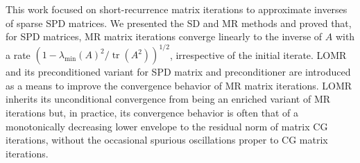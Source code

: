 \documentclass[numbers,webpdf,imanum]{ima-authoring-template}%
\theoremstyle{thmstyletwo}%
\numberwithin{equation}{section}
\begin{document}
This work focused on short-recurrence matrix iterations to approximate inverses of sparse SPD matrices.
We presented the SD and MR methods and proved that, for SPD matrices, MR matrix iterations converge linearly to the inverse of $A$ with a rate $(1-\lambda_{\min}(A)^2/\operatorname{tr}(A^2))^{1/2}$, irrespective of the initial iterate. 
LOMR and its preconditioned variant for SPD matrix and preconditioner are introduced as a means to improve the convergence behavior of MR matrix iterations.
LOMR inherits its unconditional convergence from being an enriched variant of MR iterations but, in practice, its convergence behavior is often that of a monotonically decreasing lower envelope to the residual norm of matrix CG iterations, without the occasional spurious oscillations proper to CG matrix iterations.


\end{document}
